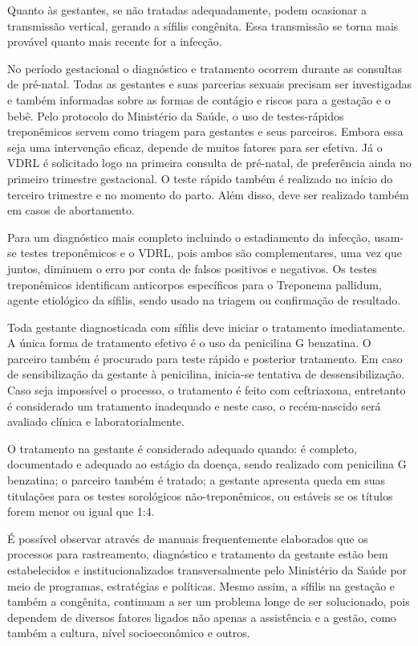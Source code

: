 Quanto às gestantes, se não tratadas adequadamente, podem ocasionar a transmissão vertical, gerando a sífilis congênita. Essa transmissão se torna mais provável quanto mais recente for a infecção. 

No período gestacional o diagnóstico e tratamento ocorrem durante as consultas de  pré-natal. Todas as gestantes e suas parcerias sexuais precisam ser investigadas  e também informadas sobre as formas de contágio e riscos para a gestação e o bebê. Pelo protocolo do Ministério da Saúde, o uso de testes-rápidos treponêmicos   servem como triagem para gestantes e seus parceiros. Embora essa seja uma intervenção eficaz,  depende de muitos fatores para ser efetiva. Já o VDRL é solicitado logo na primeira consulta de pré-natal, de preferência ainda no primeiro trimestre gestacional. O teste rápido também é realizado no início do terceiro trimestre e no momento do parto. Além disso, deve ser realizado também em casos de abortamento. \cite{brasil2015protocolo}

Para um diagnóstico mais completo incluindo o estadiamento da infecção, usam-se testes treponêmicos e o VDRL, pois ambos são complementares, uma vez que juntos, diminuem o erro por conta de falsos positivos e negativos. Os testes treponêmicos identificam anticorpos específicos para o Treponema pallidum, agente etiológico da sífilis, sendo usado na triagem ou confirmação de resultado. \cite{sao2016guia}

Toda gestante diagnosticada com sífilis deve iniciar o tratamento imediatamente. A única forma de tratamento efetivo é o uso da penicilina G benzatina. O parceiro também é procurado para teste rápido e posterior tratamento. Em caso de sensibilização da gestante à penicilina, inicia-se tentativa de dessensibilização. Caso seja impossível o processo, o tratamento é feito com ceftriaxona, entretanto é considerado um tratamento inadequado e neste caso, o recém-nascido será avaliado clínica e laboratorialmente. \cite{sao2016guia}

O tratamento na gestante é considerado adequado quando: é completo, documentado e adequado ao estágio da doença, sendo realizado com penicilina G benzatina; o parceiro também é tratado; a gestante apresenta queda em suas titulações para os testes sorológicos não-treponêmicos, ou estáveis se os títulos forem menor ou igual que 1:4. \cite{sao2016guia}

É possível observar através de manuais frequentemente elaborados que os processos para rastreamento, diagnóstico e tratamento da gestante estão bem estabelecidos e institucionalizados transversalmente pelo Ministério da Saúde por meio de programas, estratégias e políticas. Mesmo assim, a sífilis na gestação e também a congênita, continuam a ser um problema longe de ser solucionado, pois dependem de diversos fatores ligados não apenas a assistência e a gestão, como também a cultura, nível socioeconômico e outros. 

